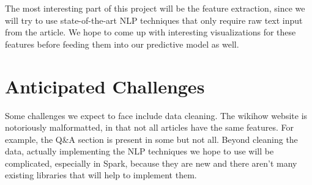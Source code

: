 \documentclass{article}
\begin{document}
The most interesting part of this project will be the feature extraction, since we will try to use state-of-the-art NLP techniques that only require raw text input from the article. We hope to come up with interesting visualizations for these features before feeding them into our predictive model as well.

\section{Anticipated Challenges}

Some challenges we expect to face include data cleaning. The wikihow website is notoriously malformatted, in that not all articles have the same features. For example, the Q&A section is present in some but not all. Beyond cleaning the data, actually implementing the NLP techniques we hope to use will be complicated, especially in Spark, because they are new and there aren't many existing libraries that will help to implement them.



\end{document}
